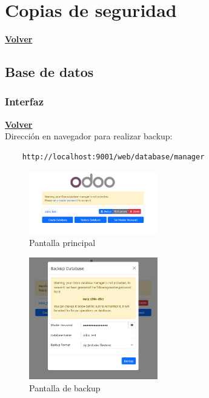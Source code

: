 \documentclass[a4paper,12pt]{article}
\begin{document}
\section{Copias de seguridad}
\hyperlink{anchor-indice}{\textbf{Volver}}\\

\subsection{Base de datos}

\subsubsection{Interfaz}
\hyperlink{anchor-indice}{\textbf{Volver}}\\

Dirección en navegador para realizar backup:
\begin{verbatim}
    http://localhost:9001/web/database/manager
\end{verbatim}


\begin{figure}[h!]
    \centering
    \includegraphics[width=0.5\textwidth]{pr2odoo76-backupInterfazPrincipal.png}
    \caption{Pantalla principal}
\end{figure}
\FloatBarrier

\begin{figure}[h!]
    \centering
    \includegraphics[width=0.5\textwidth]{pr2odoo77-backupInterfazPantallaCambio.png}
    \caption{Pantalla de backup}
\end{figure}
\FloatBarrier
\end{document}
